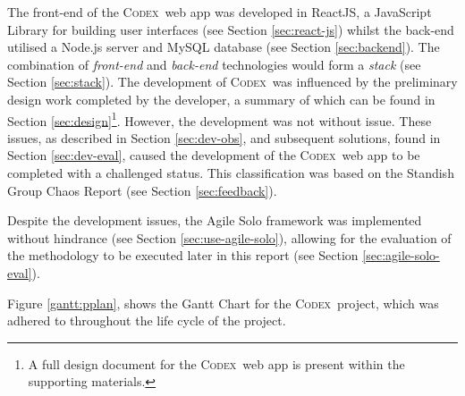 \documentclass[final]{cmpreport}
\newcommand{\Codex}{\textsc{Codex}}
\begin{document}
	The front-end of the \Codex \ web app was developed in ReactJS, a JavaScript Library for building user interfaces (see Section \ref{sec:react-js}) whilst the back-end utilised a Node.js server and MySQL database (see Section \ref{sec:backend}). The combination of \textit{front-end} and \textit{back-end} technologies would form a \emph{stack} (see Section \ref{sec:stack}). The development of \Codex \ was influenced by the preliminary design work completed by the developer, a summary of which can be found in Section \ref{sec:design}\footnote{A full design document for the \Codex \ web app is present within the supporting materials.}. However, the development was not without issue. These issues, as described in Section \ref{sec:dev-obs}, and subsequent solutions, found in Section \ref{sec:dev-eval}, caused the development of the \Codex \ web app to be completed with a challenged status. This classification was based on the Standish Group Chaos Report (see Section \ref{sec:feedback}).
	
	Despite the development issues, the Agile Solo framework was implemented without hindrance (see Section \ref{sec:use-agile-solo}), allowing for the evaluation of the methodology to be executed later in this report (see Section \ref{sec:agile-solo-eval}). 
	
	Figure \ref{gantt:pplan}, shows the Gantt Chart for the \Codex \ project, which was adhered to throughout the life cycle of the project. 
	
\end{document}
